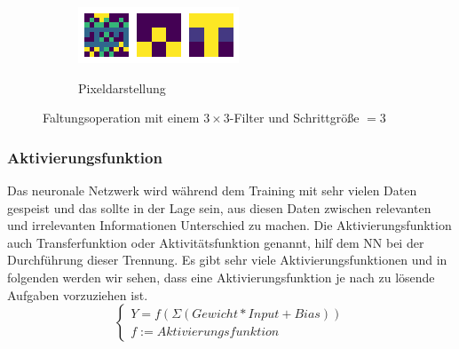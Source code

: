 \documentclass[12pt,a4paper]{scrartcl}
\numberwithin{equation}{section}
\begin{document}
\begin{figure}[h]
\begin{subfigure}{\textwidth}
		\label{fig:Faltungsoperation1}
	\end{subfigure}
	\begin{subfigure}{\textwidth}
		\centering
		\caption{ Pixeldarstellung }
		\includegraphics[width=\textwidth]{activation}
		\label{fig:Faltungsoperation2}
	\end{subfigure}
	
	\caption{Faltungsoperation mit einem $ 3\times 3$-Filter und Schrittgröße $ =3 $}
	\label{fig:Faltungsoperation}
\end{figure}

\subsubsection{Aktivierungsfunktion}
Das neuronale Netzwerk wird während dem Training mit sehr vielen Daten gespeist und das sollte in der Lage sein, aus diesen Daten zwischen relevanten und irrelevanten Informationen Unterschied zu machen.
Die Aktivierungsfunktion auch Transferfunktion oder Aktivitätsfunktion genannt, hilf dem \ac{NN} bei der Durchführung dieser Trennung. Es gibt sehr viele Aktivierungsfunktionen und in folgenden werden wir sehen, dass eine Aktivierungsfunktion je nach zu lösende Aufgaben  vorzuziehen ist.\[\begin{cases}
Y = f(\Sigma (Gewicht*Input + Bias))\\ f:= Aktivierungsfunktion
\end{cases} \]
\end{document}
